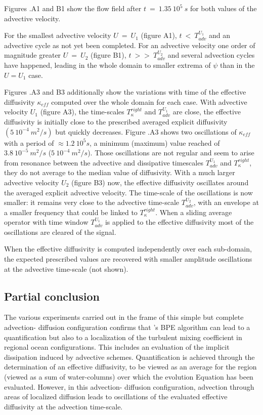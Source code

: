 Figures .A1 and B1 show the flow field after $t\ =\ 1.35\ 10^5 \ s$ for both values of the advective velocity. 

For the smallest advective velocity $U\ =\ U_1$ (figure A1), $t\ <\ T_{adv}^{U_1}$ and an advective cycle as not yet been completed.
For an advective velocity one order of magnitude greater $U\ =\ U_2$ (figure B1), $t\ >>\ T_{adv}^{U_2}$ and several advection cycles have happened, leading in the whole domain to smaller extrema of $\psi$ than in the $U=U_1$ case.

Figures .A3 and B3 additionally show the variations with time of the effective diffusivity $\kappa_{eff}$ computed over the whole domain for each case. 
With advective velocity $U_1$ (figure A3), the time-scales $T_{\kappa}^{right}$ and $T_{adv}^{U_1}$ are close, the effective diffusivity is initially close to the prescribed averaged explicit diffusivity $(5 \ 10^{-4} \ m^2/s)$ but quickly decreases. Figure .A3 shows two oscillations of $\kappa_{eff}$ with a period of $\approx 1.2 \ 10^5s$, a minimum (maximum) value reached of $3.8 \ 10^{-5} \ m^2/s$ ($5 \ 10^{-4} \ m^2/s$). Those oscillations are not regular and seem to arise from resonance between the advective and dissipative timescales $T_{adv}^{U_1}$ and $T_{\kappa}^{right}$, they do not average to the median value of diffusivity.
With a much larger advective velocity $U_2$ (figure B3) now, the effective diffusivity oscillates around the averaged explicit advective velocity. The time-scale of the oscillations is now smaller: it remains very close to the advective time-scale $T_{adv}^{U_2}$, with an envelope at a smaller frequency that could be linked to $T_{\kappa}^{right}$. When a sliding average operator with time window $T_{adv}^{U_1}$ is applied to the effective diffusivity most of the oscillations are cleared of the signal.

When the effective diffusivity is computed independently over each sub-domain, the expected prescribed values are recovered with smaller amplitude oscillations at the advective time-scale (not shown).

\subsection{Partial conclusion}
The various experiments carried out in the frame of this simple but complete advection- diffusion configuration confirms that \cite{winters_available_1995}'s BPE algorithm can lead to a quantification but also to a localization of the turbulent mixing coefficient in regional ocean configurations. This includes an evaluation of the implicit dissipation induced by advective schemes.
Quantification is achieved through the determination of an effective diffusivity, to be
viewed as an average for the region (viewed as a sum of water-columns) over which the evolution Equation  has been evaluated. However, in this advection- diffusion configuration, advection through areas of localized diffusion leads to oscillations of the evaluated effective diffusivity at the advection time-scale. 

